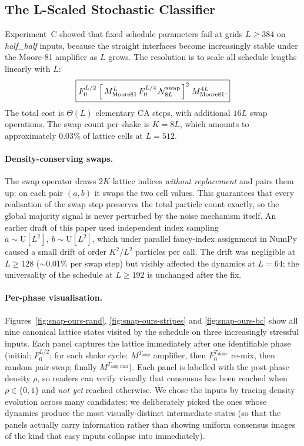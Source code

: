\documentclass[11pt,a4paper]{article}
\begin{document}
\subsection{The L-Scaled Stochastic Classifier}
\label{subsec:scaled}

Experiment~C showed that fixed schedule parameters fail at grids
\(L\geq 384\) on \emph{half\_half} inputs, because the straight interfaces
become increasingly stable under the Moore-81 amplifier as \(L\) grows.  The
resolution is to scale all schedule lengths linearly with \(L\):
\[
\fbox{$
F_0^{L/2}
\;\Bigl[\,M_{\mathrm{Moore81}}^{L}\,F_0^{L/4}\,\mathcal{N}^{\mathrm{swap}}_{8L}\,\Bigr]^{2}
\;M_{\mathrm{Moore81}}^{4L}.
$}
\]
The total cost is \(\Theta(L)\) elementary CA steps, with additional \(16L\)
swap operations.  The swap count per shake is \(K=8L\), which amounts to
approximately \(0.03\%\) of lattice cells at \(L=512\).

\paragraph{Density-conserving swaps.}
The swap operator draws \(2K\) lattice indices \emph{without replacement}
and pairs them up; on each pair \((a, b)\) it swaps the two cell values.
This guarantees that every realisation of the swap step preserves the
total particle count exactly, so the global majority signal is never
perturbed by the noise mechanism itself.  An earlier draft of this
paper used independent index sampling \(a\sim\mathrm{U}[L^2],\ b\sim
\mathrm{U}[L^2]\), which under parallel fancy-index assignment in NumPy
caused a small drift of order \(K^2/L^2\) particles per call.  The
drift was negligible at \(L\geq 128\) (\(\sim 0.01\%\) per swap step)
but visibly affected the dynamics at \(L=64\); the universality of the
schedule at \(L\geq 192\) is unchanged after the fix.

\paragraph{Per-phase visualisation.}
Figures~\ref{fig:snap-ours-rand}, \ref{fig:snap-ours-stripes} and
\ref{fig:snap-ours-bc} show all nine canonical lattice states visited
by the schedule on three increasingly stressful inputs.  Each panel
captures the lattice immediately after one identifiable phase
(initial; \(F_0^{L/2}\); for each shake cycle: \(M^{T_{\mathrm{amp}}}\)
amplifier, then \(F_0^{T_{\mathrm{shake}}}\) re-mix, then random
pair-swap; finally \(M^{T_{\mathrm{amp\_final}}}\)).  Each panel is
labelled with the post-phase density \(\rho\), so readers can verify
visually that consensus has been reached when \(\rho\in\{0,1\}\) and
\emph{not yet} reached otherwise.  We chose the inputs by tracing
density evolution across many candidates; we deliberately picked the
ones whose dynamics produce the most visually-distinct intermediate
states (so that the panels actually carry information rather than
showing uniform consensus images of the kind that easy inputs collapse
into immediately).
\end{document}
